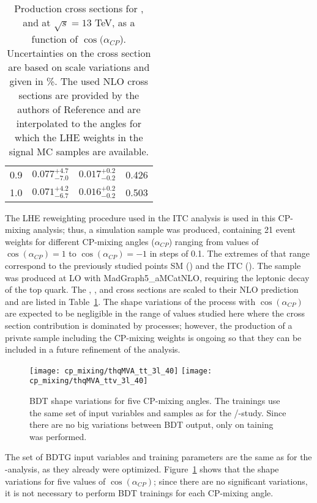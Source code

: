 \begin{table}[h!]
\begin{tabular}{lccc}
    0.9              & $0.077^{+4.7}_{-7.0}$ & $0.017^{+0.2}_{-0.2}$ & 0.426  \\
    1.0              & $0.071^{+4.2}_{-6.7}$ & $0.016^{+0.2}_{-0.2}$ & 0.503  \\\hline
\end{tabular}
  \caption[Cross sections for \tHq, \tHW and \ttH as a function of $\cos(\alpha_{CP})$ ]{Production cross sections for \tHq, \tHW and \ttH at $\sqrt{s}=13$ TeV, as a function of $\cos(\alpha_{CP}$). Uncertainties on the cross section are based on scale variations and given in \%. The used \ttH NLO cross sections are provided by the authors of Reference \cite{maltoni2} and are interpolated to the angles for which the LHE weights in the signal MC samples are available.}\label{tab:cp_signal_xsec}
\end{table}

The LHE reweighting procedure used in the ITC analysis is used in this CP-mixing analysis; thus, a \tXq simulation sample was produced, containing 21 event weights for different CP-mixing angles ($\alpha_{CP}$) ranging from values of $\cos (\alpha_{CP}) = 1$ to $\cos (\alpha_{CP}) = -1$ in steps of 0.1. The extremes of that range correspond to the previously studied points SM () and the ITC (). The sample was produced at LO with MadGraph5\_aMCatNLO, requiring the leptonic decay of the top quark. The \tHq, \tHW, and \ttH cross sections are scaled to their NLO prediction and are listed in Table~\ref{tab:cp_signal_xsec}. The shape variations of the \ttH process with $\cos (\alpha_{CP})$ are expected to be negligible in the range of values studied here where the cross section contribution is dominated by \tH processes; however, the production of a private \ttH sample including the CP-mixing weights is ongoing so that they can be included in a future refinement of the analysis.  

\begin{figure} [!h]
      \centering
      \texttt{[image: cp\_mixing/thqMVA\_tt\_3l\_40]}
      \texttt{[image: cp\_mixing/thqMVA\_ttv\_3l\_40]}
      \caption[BDT shape variations for five CP-mixing angles.]{BDT shape variations for five CP-mixing angles. The trainings use the same set of input variables and samples as for the \Ct/-\CV study. Since there are no big variations between BDT output, only on taining was performed.}
\label{fig:bdtg_output_5cp}
\end{figure}

The set of BDTG input variables and training parameters are the same as for the \Ct-\CV analysis, as they already were optimized. Figure~\ref{fig:bdtg_output_5cp} shows that the shape variations for five values of $\cos (\alpha_{CP})$; since there are no significant variations, it is not necessary to perform BDT trainings for each CP-mixing angle.    


